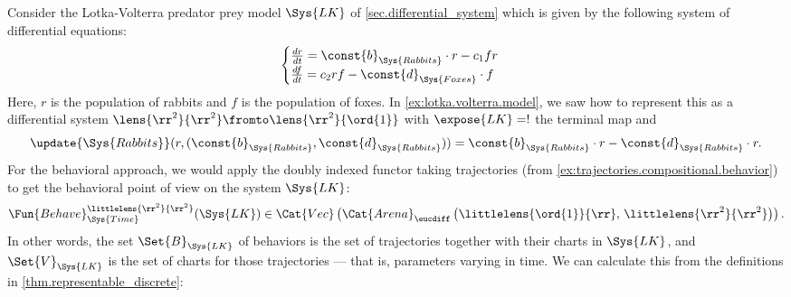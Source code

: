 \documentclass[DynamicalBook]{subfiles}
\begin{document}
\begin{example}
Consider the Lotka-Volterra predator prey model $\Sys{LK}$ of
\cref{sec.differential_system} which is given by the following system of
differential equations:
\[
  \begin{cases}

\frac{dr}{dt} =  \const{b}_{\Sys{Rabbits}}
\cdot r - c_1 f r \\
\frac{df}{dt} = c_2 r f - \const{d}_{\Sys{Foxes}}
\cdot f
  \end{cases}
\]
Here, $r$ is the population of rabbits and $f$ is the population of foxes. In
\cref{ex:lotka.volterra.model}, we saw how to represent this as a differential
system $\lens{\rr^2}{\rr^2} \fromto \lens{\rr^2}{\ord{1}}$ with $\expose{LK} =
!$ the terminal map and
  \[
\update{\Sys{Rabbits}}( {r, (\const{b}_{\Sys{Rabbits}}, \const{d}_{\Sys{Rabbits}})} )
= \const{b}_{\Sys{Rabbits}} \cdot r - \const{d}_{\Sys{Rabbits}} \cdot r.
\]
For the behavioral approach, we would apply the doubly indexed functor
taking trajectories (from \cref{ex:trajectories.compositional.behavior}) to get
the behavioral point of view on the system $\Sys{LK}$:
\[
\Fun{Behave}_{\Sys{Time}}^{\littlelens{\rr^2}{\rr^2}}(\Sys{LK}) \in \Cat{Vec}\left(
  \Cat{Arena}_{\eucdiff}\left( \littlelens{\ord{1}}{\rr},\,
    \littlelens{\rr^2}{\rr^2} \right) \right).
\]
In other words, the set $\Set{B}_{\Sys{LK}}$ of behaviors is the set of trajectories together
with their charts in $\Sys{LK}$, and $\Set{V}_{\Sys{LK}}$ is the set of charts
for those trajectories --- that is, parameters varying in time. We can calculate
this from the definitions in \cref{thm.representable_discrete}:


\end{example}
\end{document}
